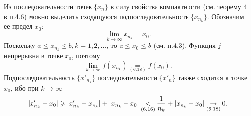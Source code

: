 \documentclass{book}
\begin{document}
\indent Из последовательности точек \begin{math}\{x_{n}\}\end{math} в силу свойства компактности (см. теорему 4 в п.4.6) можно выделить сходящуюся подпоследовательность \begin{math}\{x_{n_{k}}\}\end{math}. Обозначим ее предел $x_{0}$:
\begin{equation} \tag{6.18}
\lim_{k\to \infty} x_{n_{k}} = x_{0}.
\end{equation}
Поскольку \begin{math}a\leqslant x_{n_{k}} \leqslant b, k = 1,2, ...\end{math}, то 
\begin{math}a\leqslant x_{0} \leqslant b\end{math} (см. п.4.3). Функция $f$ непрерывна в точке $x_{0}$, поэтому
\begin{equation} \tag{6.19}
\lim_{k\to \infty} f(x_{n_{k}}) \underset{(6.18)} = f(x_{0}).
\end{equation}
Подпоследовательность $\{x'_{n_{k}}\}$ последовательности $\{x'_{n}\}$ также сходится к точке $x_{0}$, ибо при $k \to \infty$.
\begin{equation} \notag
|x'_{n_{k}} - x_{0}| \geqslant |x'_{n_{k}} - x_{n_{k}}| + |x_{n_{k}} - x_{0}| \underset{(6.16)} < \frac{1}{n_{k}} + |x_{n_{k}} - x_{0}| \underset{(6.18)} \to 0.
\end{equation}
\end{document}
